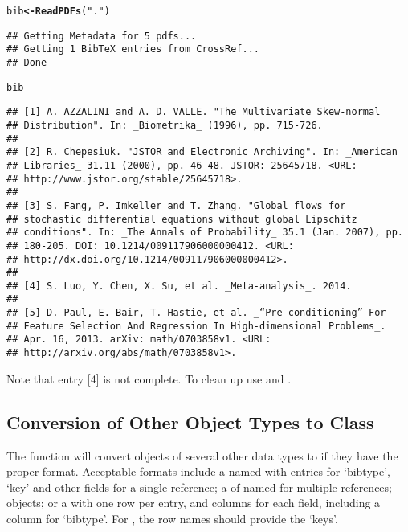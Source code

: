 \documentclass[article]{jss}\usepackage[]{graphicx}\usepackage[]{color}
\makeatletter
\newcommand{\hlstr}[1]{\textcolor[rgb]{0.125,0.125,1}{#1}}%
\newcommand{\hlstd}[1]{\textcolor[rgb]{0.251,0.251,0.282}{#1}}%
\newcommand{\hlkwb}[1]{\textcolor[rgb]{0.439,0.251,1}{\textbf{#1}}}%
\newcommand{\hlkwd}[1]{\textcolor[rgb]{0.251,0.251,0.282}{\textbf{#1}}}%
\newenvironment{kframe}{%
 \def\at@end@of@kframe{}%
 \ifinner\ifhmode%
  \def\at@end@of@kframe{\end{minipage}}%
  \begin{minipage}{\columnwidth}%
 \fi\fi%
 \def\FrameCommand##1{\hskip\@totalleftmargin \hskip-\fboxsep
 \colorbox{shadecolor}{##1}\hskip-\fboxsep
     \hskip-\linewidth \hskip-\@totalleftmargin \hskip\columnwidth}%
 \MakeFramed {\advance\hsize-\width
   \@totalleftmargin\z@ \linewidth\hsize
   \@setminipage}}%
 {\par\unskip\endMakeFramed%
 \at@end@of@kframe}
\newenvironment{knitrout}{}{} %
\makeatother
\begin{document}
\begin{knitrout}
\color{fgcolor}\begin{kframe}
\begin{alltt}
\hlstd{bib} \hlkwb{<-} \hlkwd{ReadPDFs}\hlstd{(}\hlstr{"."}\hlstd{)}
\end{alltt}
\begin{lstlisting}
## Getting Metadata for 5 pdfs...
## Getting 1 BibTeX entries from CrossRef...
## Done
\end{lstlisting}\begin{alltt}
\hlstd{bib}
\end{alltt}
\begin{verbatim}
## [1] A. AZZALINI and A. D. VALLE. "The Multivariate Skew-normal
## Distribution". In: _Biometrika_ (1996), pp. 715-726.
## 
## [2] R. Chepesiuk. "JSTOR and Electronic Archiving". In: _American
## Libraries_ 31.11 (2000), pp. 46-48. JSTOR: 25645718. <URL:
## http://www.jstor.org/stable/25645718>.
## 
## [3] S. Fang, P. Imkeller and T. Zhang. "Global flows for
## stochastic differential equations without global Lipschitz
## conditions". In: _The Annals of Probability_ 35.1 (Jan. 2007), pp.
## 180-205. DOI: 10.1214/009117906000000412. <URL:
## http://dx.doi.org/10.1214/009117906000000412>.
## 
## [4] S. Luo, Y. Chen, X. Su, et al. _Meta-analysis_. 2014.
## 
## [5] D. Paul, E. Bair, T. Hastie, et al. _“Pre-conditioning” For
## Feature Selection And Regression In High-dimensional Problems_.
## Apr. 16, 2013. arXiv: math/0703858v1. <URL:
## http://arxiv.org/abs/math/0703858v1>.
\end{verbatim}
\end{kframe}
\end{knitrout}

Note that entry [4] is not complete.  To clean up use  and .

\subsection[Conversion of Other Object Types to Class BibEntry]{Conversion of Other Object Types to Class }
The  function will convert objects of several other data types to  if they have the proper format.  Acceptable formats include a named  with entries for `bibtype', `key' and other fields for a single reference; a  of named  for multiple references;  objects; or a  with one row per entry, and columns for each field, including a column for `bibtype'.  For , the row names should provide the `keys'.
\end{document}
